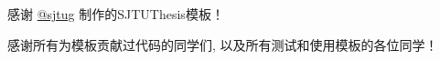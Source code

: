 
\begin{acknowledgements}
  感谢 \href{https://github.com/sjtug/SJTUThesis}{@sjtug} 制作的SJTUThesis模板！

  感谢所有为模板贡献过代码的同学们, 以及所有测试和使用模板的各位同学！
\end{acknowledgements}
